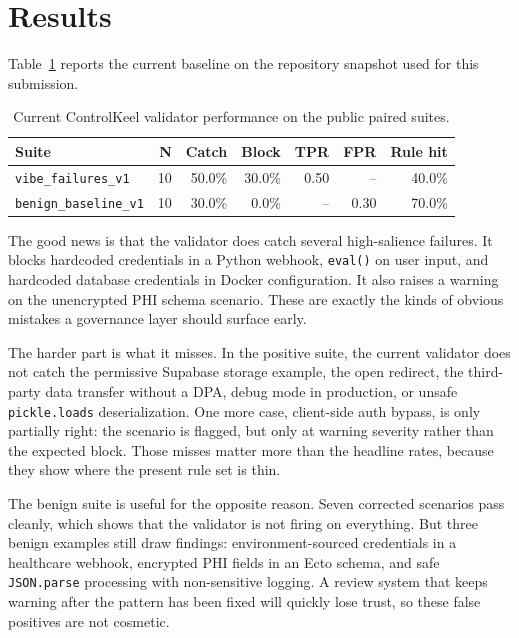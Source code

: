 \documentclass[10pt]{article}
\begin{document}
\section{Results}

Table~\ref{tab:results} reports the current baseline on the repository snapshot used for this submission.

\begin{table}[h]
\centering
\small
\begin{tabular}{lrrrrrr}
\toprule
Suite & N & Catch & Block & TPR & FPR & Rule hit \\
\midrule
\texttt{vibe\_failures\_v1} & 10 & 50.0\% & 30.0\% & 0.50 & -- & 40.0\% \\
\texttt{benign\_baseline\_v1} & 10 & 30.0\% & 0.0\% & -- & 0.30 & 70.0\% \\
\bottomrule
\end{tabular}
\caption{Current ControlKeel validator performance on the public paired suites.}
\label{tab:results}
\end{table}

The good news is that the validator does catch several high-salience failures. It blocks hardcoded credentials in a Python webhook, \texttt{eval()} on user input, and hardcoded database credentials in Docker configuration. It also raises a warning on the unencrypted PHI schema scenario. These are exactly the kinds of obvious mistakes a governance layer should surface early.

The harder part is what it misses. In the positive suite, the current validator does not catch the permissive Supabase storage example, the open redirect, the third-party data transfer without a DPA, debug mode in production, or unsafe \texttt{pickle.loads} deserialization. One more case, client-side auth bypass, is only partially right: the scenario is flagged, but only at warning severity rather than the expected block. Those misses matter more than the headline rates, because they show where the present rule set is thin.

The benign suite is useful for the opposite reason. Seven corrected scenarios pass cleanly, which shows that the validator is not firing on everything. But three benign examples still draw findings: environment-sourced credentials in a healthcare webhook, encrypted PHI fields in an Ecto schema, and safe \texttt{JSON.parse} processing with non-sensitive logging. A review system that keeps warning after the pattern has been fixed will quickly lose trust, so these false positives are not cosmetic.
\end{document}
